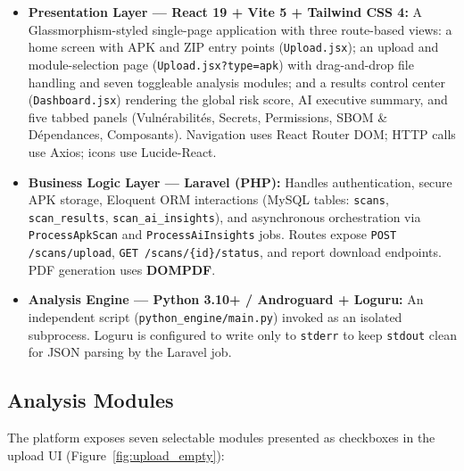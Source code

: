 \documentclass[3p,times]{elsarticle}
\begin{document}
\begin{itemize}
  \item \textbf{Presentation Layer — React 19 + Vite 5 + Tailwind CSS 4:}
  A Glassmorphism-styled single-page application with three route-based
  views: a home screen with APK and ZIP entry points (\texttt{Upload.jsx});
  an upload and module-selection page (\texttt{Upload.jsx?type=apk}) with
  drag-and-drop file handling and seven toggleable analysis modules; and a
  results control center (\texttt{Dashboard.jsx}) rendering the global risk
  score, AI executive summary, and five tabbed panels (Vuln\'{e}rabilit\'{e}s,
  Secrets, Permissions, SBOM \& D\'{e}pendances, Composants). Navigation
  uses React Router DOM; HTTP calls use Axios; icons use Lucide-React.

  \item \textbf{Business Logic Layer — Laravel (PHP):}
  Handles authentication, secure APK storage, Eloquent ORM interactions
  (MySQL tables: \texttt{scans}, \texttt{scan\_results},
  \texttt{scan\_ai\_insights}), and asynchronous orchestration via
  \texttt{ProcessApkScan} and \texttt{ProcessAiInsights} jobs.
  Routes expose \texttt{POST /scans/upload},
  \texttt{GET /scans/\{id\}/status}, and report download endpoints.
  PDF generation uses \textbf{DOMPDF}.

  \item \textbf{Analysis Engine — Python 3.10+ / Androguard + Loguru:}
  An independent script (\texttt{python\_engine/main.py}) invoked as an
  isolated subprocess. Loguru is configured to write only to \texttt{stderr}
  to keep \texttt{stdout} clean for JSON parsing by the Laravel job.
\end{itemize}

\subsection{Analysis Modules}

The platform exposes seven selectable modules presented as checkboxes in
the upload UI (Figure~\ref{fig:upload_empty}):
\end{document}
